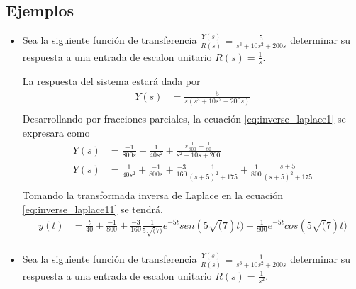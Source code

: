 \documentclass[12pt]{article}
\begin{document}
\subsection{Ejemplos}
\begin{itemize}
    \item Sea la siguiente función de transferencia $\frac{Y(s)}{R(s)}=\frac{5}{s^3+10s^2+200s}$ determinar su respuesta a una entrada de escalon unitario $R(s)=\frac{1}{s}$.
    
    La respuesta del sistema estará dada por 
    \begin{equation}
        \begin{split}
            Y(s)&=\frac{5}{s(s^3+10s^2+200s)}\\
            \label{eq:inverse_laplace1}
        \end{split}
    \end{equation}
    Desarrollando por fracciones parciales, la ecuación \ref{eq:inverse_laplace1} se expresara como
    \begin{equation}
        \begin{split}
            Y(s)&=\frac{-1}{800s}+\frac{1}{40s^2}+\frac{s\frac{1}{800}-\frac{1}{80}}{s^2+10s+200}\\
            Y(s)&=\frac{1}{40s^2}+\frac{-1}{800s}+\frac{-3}{160}\frac{1}{(s+5)^2+175}+\frac{1}{800}\frac{s+5}{(s+5)^2+175}\\
            \label{eq:inverse_laplace11}
        \end{split}
    \end{equation}
    Tomando la transformada inversa de Laplace en la ecuación \ref{eq:inverse_laplace11} se tendrá.
    \begin{equation}
        \begin{split}
            y(t)&=\frac{t}{40}+\frac{-1}{800}+\frac{-3}{160}\frac{1}{5\sqrt(7)}e^{-5t}sen(5\sqrt(7)t)+\frac{1}{800}e^{-5t}cos(5\sqrt(7)t)\\
            \label{eq:inverse_laplace12}
        \end{split}
    \end{equation}

    \item Sea la siguiente función de transferencia $\frac{Y(s)}{R(s)}=\frac{1}{s^3+10s^2+200s}$ determinar su respuesta a una entrada de escalon unitario $R(s)=\frac{1}{s^2}$.
    

\end{itemize}
\end{document}
